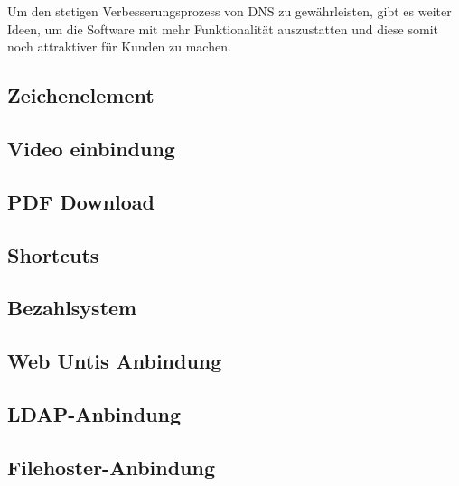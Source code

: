 Um den stetigen Verbesserungsprozess von DNS zu gewährleisten, gibt es weiter Ideen, um die Software mit mehr Funktionalität auszustatten und diese somit noch attraktiver für Kunden zu machen. 
\subsection{Zeichenelement}
\subsection{Video einbindung}
\subsection{PDF Download}
\subsection{Shortcuts}
\subsection{Bezahlsystem}
\subsection{Web Untis Anbindung}
\subsection{LDAP-Anbindung}
\subsection{Filehoster-Anbindung }

